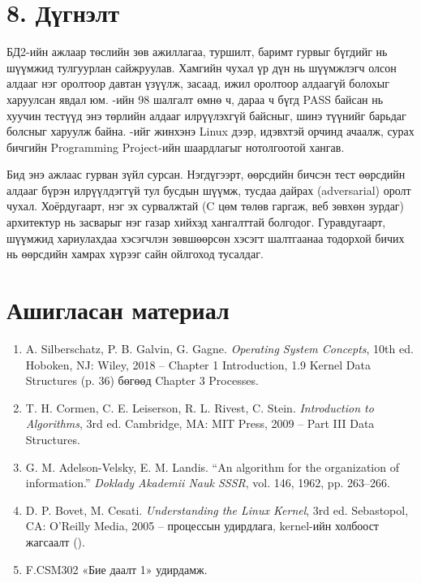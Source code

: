 \section*{8. Дүгнэлт}
БД2-ийн ажлаар төслийн зөв ажиллагаа, туршилт, баримт гурвыг бүгдийг нь шүүмжид тулгуурлан сайжруулав. Хамгийн чухал үр дүн нь шүүмжлэгч олсон  алдааг нэг оролтоор давтан үзүүлж, засаад, ижил оролтоор алдаагүй болохыг харуулсан явдал юм. -ийн 98 шалгалт өмнө ч, дараа ч бүгд PASS байсан нь хуучин тестүүд энэ төрлийн алдааг илрүүлэхгүй байсныг, шинэ  түүнийг барьдаг болсныг харуулж байна. -ийг жинхэнэ Linux дээр,  идэвхтэй орчинд ачаалж, сурах бичгийн Programming Project-ийн шаардлагыг нотолгоотой хангав.

Бид энэ ажлаас гурван зүйл сурсан. Нэгдүгээрт, өөрсдийн бичсэн тест өөрсдийн алдааг бүрэн илрүүлдэггүй тул бусдын шүүмж, тусдаа дайрах (adversarial) оролт чухал. Хоёрдугаарт, нэг эх сурвалжтай (C цөм  төлөв гаргаж, веб зөвхөн зурдаг) архитектур нь засварыг нэг газар хийхэд хангалттай болгодог. Гуравдугаарт, шүүмжид хариулахдаа хэсэгчлэн зөвшөөрсөн хэсэгт шалтгаанаа тодорхой бичих нь өөрсдийн хамрах хүрээг сайн ойлгоход тусалдаг.

\section*{Ашигласан материал}

\begin{enumerate}[leftmargin=22pt,itemsep=2pt,topsep=2pt]
  \item \hypertarget{ref1}{} A. Silberschatz, P. B. Galvin, G. Gagne. \textit{Operating System Concepts}, 10th ed. Hoboken, NJ: Wiley, 2018 -- Chapter 1 Introduction, 1.9 Kernel Data Structures (p. 36) бөгөөд Chapter 3 Processes.
  \item \hypertarget{ref2}{} T. H. Cormen, C. E. Leiserson, R. L. Rivest, C. Stein. \textit{Introduction to Algorithms}, 3rd ed. Cambridge, MA: MIT Press, 2009 -- Part III Data Structures.
  \item \hypertarget{ref3}{} G. M. Adelson-Velsky, E. M. Landis. ``An algorithm for the organization of information.'' \textit{Doklady Akademii Nauk SSSR}, vol. 146, 1962, pp. 263--266.
  \item \hypertarget{ref4}{} D. P. Bovet, M. Cesati. \textit{Understanding the Linux Kernel}, 3rd ed. Sebastopol, CA: O'Reilly Media, 2005 -- процессын удирдлага, kernel-ийн холбоост жагсаалт ().
  \item \hypertarget{ref5}{} F.CSM302 «Бие даалт 1» удирдамж.
\end{enumerate}

